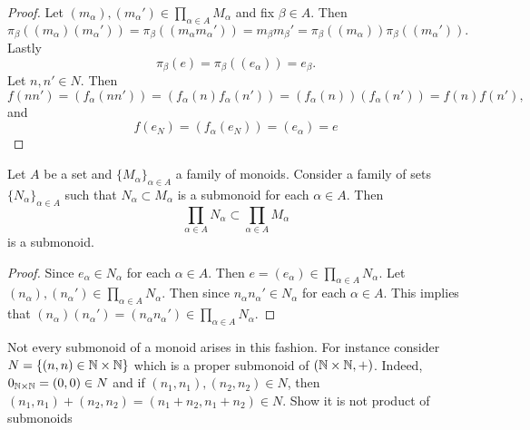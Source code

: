 \begin{proof}
    Let $(m_\alpha),(m_\alpha')\in \prod_{\alpha\in A} M_\alpha$ and fix $\beta \in A$. Then 
    $$\pi_\beta((m_\alpha)(m_\alpha'))= \pi_\beta((m_\alpha m_\alpha')) = m_\beta m_\beta' = \pi_\beta((m_\alpha))\pi_\beta((m_\alpha')).$$
    Lastly 
    $$\pi_\beta(e)=\pi_\beta((e_\alpha))=e_\beta.$$
    Let $n,n' \in N$. Then 
    $$f(nn') = (f_\alpha(nn'))=(f_\alpha(n)f_\alpha(n'))=(f_\alpha(n))(f_\alpha(n'))=f(n)f(n'),$$
    and 
    $$f(e_N)=(f_\alpha(e_N))=(e_\alpha)=e$$
\end{proof}
\begin{proposition}\label{CertainSubmonoidsOfProductMonoid}
    Let $A$ be a set and $\{M_\alpha\}_{\alpha\in A}$ a family of monoids. Consider a family of sets $\{N_\alpha\}_{\alpha\in A}$ such that $N_\alpha\subset M_\alpha$ is a submonoid for each $\alpha\in A$. Then $$\prod_{\alpha\in A} N_\alpha \subset \prod_{\alpha \in A} M_\alpha$$
    is a submonoid.
\end{proposition}
\begin{proof}
    Since $e_\alpha \in N_\alpha$ for each $\alpha \in A$. Then $e=(e_\alpha)\in \prod_{\alpha\in A} N_\alpha.$ Let $(n_\alpha),(n_\alpha')\in \prod_{\alpha\in A} N_\alpha$. Then since $n_\alpha n_\alpha'\in N_\alpha$ for each $\alpha \in A$. This implies that $(n_\alpha)(n_\alpha') = (n_\alpha n_\alpha')\in \prod_{\alpha\in A} N_\alpha$.
\end{proof}
\begin{example}
    Not every submonoid of a monoid arises in this fashion. For instance consider $N=\{(n,n)\in\mathbb{N}\times \mathbb{N} \}$ which is a proper submonoid of $(\mathbb{N}\times \mathbb{N},+)$. Indeed, $0_{\mathbb{N}\times \mathbb{N}} = (0,0)\in N$ and if $(n_1,n_1),(n_2,n_2)\in N$, then $(n_1,n_1)+(n_2,n_2)=(n_1+n_2,n_1+n_2)\in N$. {\Large Show it is not product of submonoids}
\end{example}
